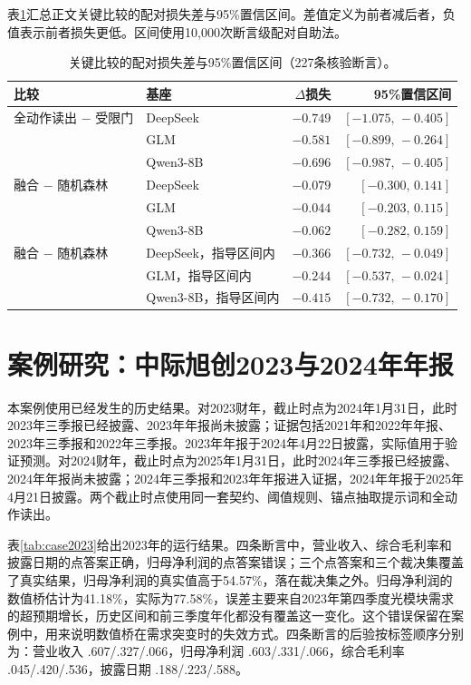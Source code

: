表\ref{tab:paired}汇总正文关键比较的配对损失差与95\%置信区间。差值定义为前者减后者，负值表示前者损失更低。区间使用10,000次断言级配对自助法。

\begin{table}[htbp]
\centering
{}
\setlength{\tabcolsep}{4pt}
\caption{关键比较的配对损失差与95\%置信区间（227条核验断言）。}
\label{tab:paired}
\begin{tabular}{llrr}
\toprule
比较 & 基座 & $\Delta$损失 & 95\%置信区间 \\
\midrule
全动作读出 $-$ 受限门 & DeepSeek & $-0.749$ & $[-1.075,\,-0.405]$ \\
 & GLM & $-0.581$ & $[-0.899,\,-0.264]$ \\
 & Qwen3-8B & $-0.696$ & $[-0.987,\,-0.405]$ \\
\midrule
融合 $-$ 随机森林 & DeepSeek & $-0.079$ & $[-0.300,\,0.141]$ \\
 & GLM & $-0.044$ & $[-0.203,\,0.115]$ \\
 & Qwen3-8B & $-0.062$ & $[-0.282,\,0.159]$ \\
\midrule
融合 $-$ 随机森林 & DeepSeek，指导区间内 & $-0.366$ & $[-0.732,\,-0.049]$ \\
 & GLM，指导区间内 & $-0.244$ & $[-0.537,\,-0.024]$ \\
 & Qwen3-8B，指导区间内 & $-0.415$ & $[-0.732,\,-0.170]$ \\
\bottomrule
\end{tabular}
\end{table}

\chapter{案例研究：中际旭创2023与2024年年报}
\label{app:case}

本案例使用已经发生的历史结果。对2023财年，截止时点为2024年1月31日，此时2023年三季报已经披露、2023年年报尚未披露；证据包括2021年和2022年年报、2023年三季报和2022年三季报。2023年年报于2024年4月22日披露，实际值用于验证预测。对2024财年，截止时点为2025年1月31日，此时2024年三季报已经披露、2024年年报尚未披露；2024年三季报和2023年年报进入证据，2024年年报于2025年4月21日披露。两个截止时点使用同一套契约、阈值规则、锚点抽取提示词和全动作读出。

表\ref{tab:case2023}给出2023年的运行结果。四条断言中，营业收入、综合毛利率和披露日期的点答案正确，归母净利润的点答案错误；三个点答案和三个裁决集覆盖了真实结果，归母净利润的真实值高于54.57\%，落在裁决集之外。归母净利润的数值桥估计为41.18\%，实际为77.58\%，误差主要来自2023年第四季度光模块需求的超预期增长，历史区间和前三季度年化都没有覆盖这一变化。这个错误保留在案例中，用来说明数值桥在需求突变时的失效方式。四条断言的后验按标签顺序分别为：营业收入 .607/.327/.066，归母净利润 .603/.331/.066，综合毛利率 .045/.420/.536，披露日期 .188/.223/.588。

